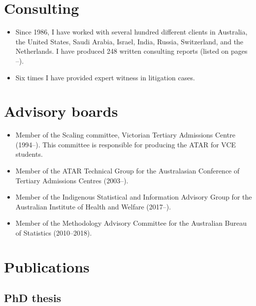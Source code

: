 \documentclass[10pt,a4paper,]{article}
\providecommand{\tightlist}{%
  \setlength{\itemsep}{0pt}\setlength{\parskip}{0pt}}
\renewcommand{\bibfont}{\normalfont\fontsize{10}{12.4}\selectfont}
\begin{document}
\hypertarget{consulting}{%
\section{Consulting}\label{consulting}}

\begin{itemize}
\tightlist
\item
  Since 1986, I have worked with several hundred different clients in Australia, the United States, Saudi Arabia, Israel, India, Russia, Switzerland, and the Netherlands. I have produced 248 written consulting reports (listed on pages \pageref{consultingstart}--\pageref{consultingend}).
\item
  Six times I have provided expert witness in litigation cases.
\end{itemize}

\hypertarget{advisory-boards}{%
\section{Advisory boards}\label{advisory-boards}}

\begin{itemize}
\tightlist
\item
  Member of the Scaling committee, Victorian Tertiary Admissions Centre (1994--). This committee is responsible for producing the ATAR for VCE students.
\item
  Member of the ATAR Technical Group for the Australasian Conference of Tertiary Admissions Centres (2003--).
\item
  Member of the Indigenous Statistical and Information Advisory Group for the Australian Institute of Health and Welfare (2017--).
\item
  Member of the Methodology Advisory Committee for the Australian Bureau of Statistics (2010--2018).
\end{itemize}

\newpage

\hypertarget{publications}{%
\section{Publications}\label{publications}}

\renewcommand{\bibfont}{\normalfont\fontsize{10}{11.8}\sffamily}

\hypertarget{phd-thesis}{%
\subsection{PhD thesis}\label{phd-thesis}}
\end{document}
